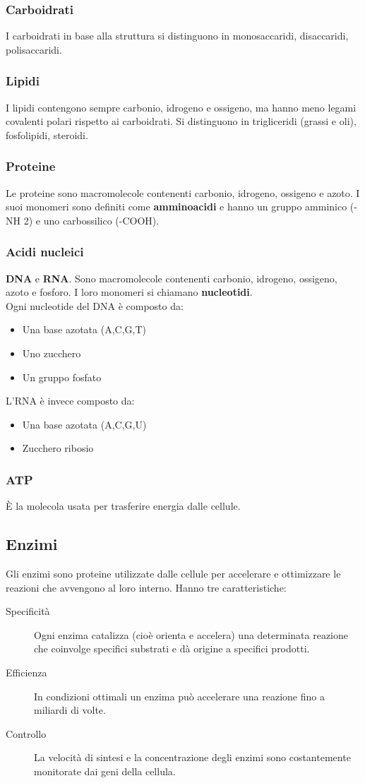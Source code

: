 \documentclass[a4paper]{article}
\begin{document}
\subsubsection{Carboidrati}
I carboidrati in base alla struttura si distinguono in monosaccaridi, 
disaccaridi, polisaccaridi.
\subsubsection{Lipidi}
I lipidi contengono sempre carbonio, idrogeno e ossigeno, ma hanno meno legami 
covalenti polari rispetto ai carboidrati. Si distinguono in trigliceridi 
(grassi e oli), fosfolipidi, steroidi.
\subsubsection{Proteine}
Le proteine sono macromolecole contenenti carbonio, idrogeno, ossigeno e 
azoto. I suoi monomeri sono definiti come \textbf{amminoacidi} e hanno un
gruppo amminico (-NH 2) e uno carbossilico (-COOH).
\subsubsection{Acidi nucleici}
\textbf{DNA} e \textbf{RNA}. Sono macromolecole contenenti carbonio, idrogeno, 
ossigeno, azoto e fosforo. I loro monomeri si chiamano \textbf{nucleotidi}. \\
Ogni nucleotide del DNA è composto da:
\begin{itemize}
    \item Una base azotata (A,C,G,T)
    \item Uno zucchero
    \item Un gruppo fosfato
\end{itemize}
L'RNA è invece composto da: 
\begin{itemize}
    \item Una base azotata (A,C,G,U)
    \item Zucchero ribosio
\end{itemize}
\subsubsection{ATP}
È la molecola usata per trasferire energia dalle cellule.
\subsection{Enzimi}
Gli enzimi sono proteine utilizzate dalle cellule per accelerare e ottimizzare 
le reazioni che avvengono al loro interno. Hanno tre caratteristiche:
\begin{description}
\item[Specificità] Ogni enzima catalizza (cioè orienta e accelera) una 
determinata reazione che coinvolge specifici substrati e dà origine a 
specifici prodotti.
\item[Efficienza] In condizioni ottimali un enzima può accelerare una reazione 
fino a miliardi di volte.
\item[Controllo] La velocità di sintesi e la concentrazione degli enzimi sono 
costantemente monitorate dai geni della cellula.
\end{description}
\end{document}
